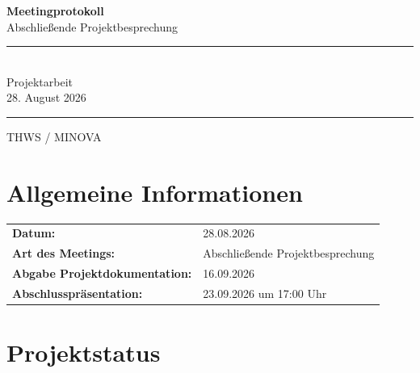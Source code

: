 \documentclass[a4paper,11pt]{article}
\begin{document}

\begin{titlepage}

\centering

\vspace*{3cm}

{\Huge \textbf{Meetingprotokoll}}\\[0.5cm]

{\Large Abschließende Projektbesprechung}\\[2cm]

\rule{12cm}{0.5pt}\\[0.5cm]

{\Large Projektarbeit}\\[0.3cm]

{\large 28. August 2026}\\[0.5cm]

\rule{12cm}{0.5pt}

\vfill

{\large THWS / MINOVA}

\end{titlepage}

\tableofcontents

\newpage


\section{Allgemeine Informationen}

\begin{tabular}{ll}

\textbf{Datum:} & 28.08.2026 \\

\textbf{Art des Meetings:} & Abschließende Projektbesprechung \\

\textbf{Abgabe Projektdokumentation:} & 16.09.2026 \\

\textbf{Abschlusspräsentation:} & 23.09.2026 um 17:00 Uhr \\

\end{tabular}


\section{Projektstatus}
\end{document}
